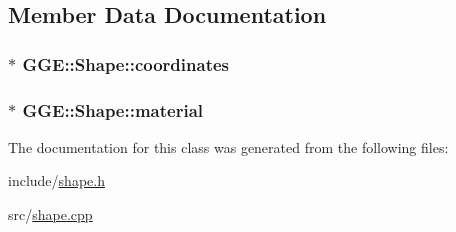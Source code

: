 \subsection{Member Data Documentation}
\hypertarget{class_g_g_e_1_1_shape_ad6392d5b844dc53fb1ecdf243cdc5768}{
\subsubsection[{coordinates}]{$\ast$ G\+G\+E\+::\+Shape\+::coordinates\hspace{0.3cm}{\ttfamily [private]}}}\label{class_g_g_e_1_1_shape_ad6392d5b844dc53fb1ecdf243cdc5768}
\hypertarget{class_g_g_e_1_1_shape_ace878a519d26bf5d2f6ea9069d848005}{
\subsubsection[{material}]{$\ast$ G\+G\+E\+::\+Shape\+::material\hspace{0.3cm}{\ttfamily [private]}}}\label{class_g_g_e_1_1_shape_ace878a519d26bf5d2f6ea9069d848005}


The documentation for this class was generated from the following files\+:\begin{DoxyCompactItemize}
\item 
include/\hyperlink{shape_8h}{shape.\+h}\item 
src/\hyperlink{shape_8cpp}{shape.\+cpp}\end{DoxyCompactItemize}
